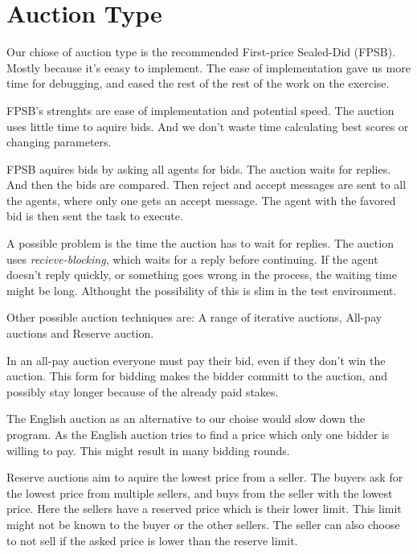 \section{Auction Type}\label{sec:auction}

Our chiose of auction type is the recommended First-price Sealed-Did (FPSB).
Mostly because it's eeasy to implement. The ease of implementation gave us more
time for debugging, and eased the rest of the rest of the work on the exercise. 

FPSB's strenghts are ease of implementation and potential speed. The auction uses little
time to aquire bids. And we don't waste time calculating best scores or changing
parameters. 

FPSB aquires bids by asking all agents for bids. The auction waits for replies.
And then the bids are compared. Then reject and accept messages are sent to all
the agents, where only one gets an accept message. The agent with the favored
bid is then sent the task to execute. 

A possible problem is the time the auction has
to wait for replies. The auction uses \textit{recieve-blocking}, which waits
for a reply before continuing. If the agent doesn't reply quickly, or something
goes wrong in the process, the waiting time might be long. Althought the possibility of this is
slim in the test environment.

Other possible auction techniques are: 
A range of iterative auctions, All-pay auctions and Reserve auction. 

In an all-pay auction everyone must pay their bid, even if they don't win the
auction. This form for bidding makes the bidder committ to the auction, and
possibly stay longer because of the already paid stakes. 

The English auction as an alternative to our choise would slow down the
program. As the English auction tries to find a price which only one bidder is
willing to pay. This might result in many bidding rounds.

Reserve auctions aim to aquire the lowest price from a seller. The buyers ask
for the lowest price from multiple sellers, and buys from the seller with the
lowest price. Here the sellers have a reserved price which is their lower
limit. This limit might not be known to the buyer or the other sellers. The
seller can also choose to not sell if the asked price is lower than the
reserve limit. 

